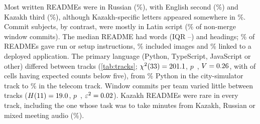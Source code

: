 \documentclass{article}
\begin{document}
Most written READMEs were in Russian (\NRqThreeReadmeRussianPct\%), with English second (\NRqThreeReadmeEnglishPct\%) and Kazakh third (\NRqThreeReadmeKazakhPct\%), although Kazakh-specific letters appeared somewhere in \NRqThreeReadmeAnyKazakhLetterPct\%. Commit subjects, by contrast, were mostly in Latin script (\NRqThreeSubjectScriptLatinPct\% of non-merge window commits). The median README had \NRqThreeReadmeWordsMedian{} words (IQR \NRqThreeReadmeWordsQOne--\NRqThreeReadmeWordsQThree) and \NRqThreeReadmeHeadingsMedian{} headings; \NRqThreeReadmeRunInstructionsPct\% of READMEs gave run or setup instructions, \NRqThreeReadmeImagesPct\% included images and \NRqThreeReadmeDeployedLinkPct\% linked to a deployed application. The primary language (Python, TypeScript, JavaScript or other) differed between tracks (\cref{tab:tracks}; $\chi^2(\num{33}) = \num{201.1}$, $p$~\NRqThreeLanguageByTrackP, $V = \num{0.26}$, with \NRqThreeLanguageByTrackCellsExpectedBelowFive{} of \NRqThreeLanguageByTrackCells{} cells having expected counts below five), from \NRqThreeTracksTOneTwoPython\% Python in the city-simulator track to \NRqThreeTracksTZeroFourPython\% in the telecom track. Window commits per team varied little between tracks ($H(\num{11}) = \num{19.0}$, $p$~\NRqThreeCommitsByTrackP, $\varepsilon^2 = \num{0.02}$). Kazakh READMEs were rare in every track, including the one whose task was to take minutes from Kazakh, Russian or mixed meeting audio (\NRqThreeTracksTZeroEightKazakh\%).
\end{document}
